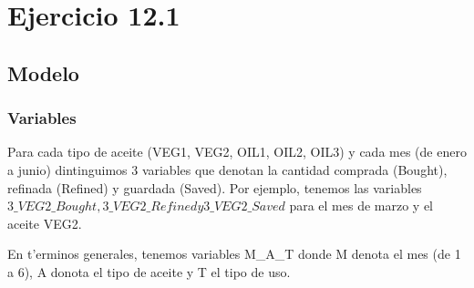 \section{Ejercicio 12.1}
\subsection{Modelo}
\subsubsection{Variables}
Para cada tipo de aceite (VEG1, VEG2, OIL1, OIL2, OIL3) y cada mes (de enero a junio) dintinguimos 3 variables que denotan la cantidad comprada (Bought), refinada (Refined) y guardada (Saved). Por ejemplo, tenemos las variables $3\_VEG2\_Bought, 3\_VEG2\_Refined y 3\_VEG2\_Saved$ para el mes de marzo y el aceite VEG2.

En t'erminos generales, tenemos variables M\_A\_T donde M denota el mes (de 1 a 6), A donota el tipo de aceite y T el tipo de uso. 
